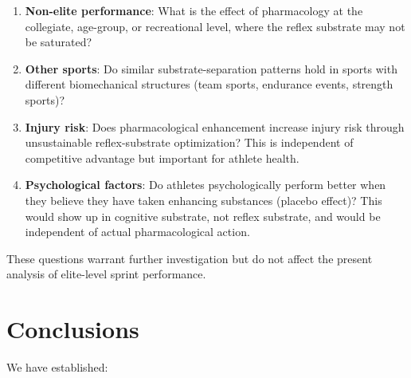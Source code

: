 \documentclass[11pt,twocolumn]{article}
\theoremstyle{definition}
\theoremstyle{remark}
\begin{document}
\begin{enumerate}[leftmargin=1.2em]
\item \textbf{Non-elite performance}: What is the effect of pharmacology at the collegiate, age-group, or recreational level, where the reflex substrate may not be saturated?

\item \textbf{Other sports}: Do similar substrate-separation patterns hold in sports with different biomechanical structures (team sports, endurance events, strength sports)?

\item \textbf{Injury risk}: Does pharmacological enhancement increase injury risk through unsustainable reflex-substrate optimization? This is independent of competitive advantage but important for athlete health.

\item \textbf{Psychological factors}: Do athletes psychologically perform better when they believe they have taken enhancing substances (placebo effect)? This would show up in cognitive substrate, not reflex substrate, and would be independent of actual pharmacological action.

\end{enumerate}

These questions warrant further investigation but do not affect the present analysis of elite-level sprint performance.

\section{Conclusions}
\label{sec:conclusion}

We have established:
\end{document}
